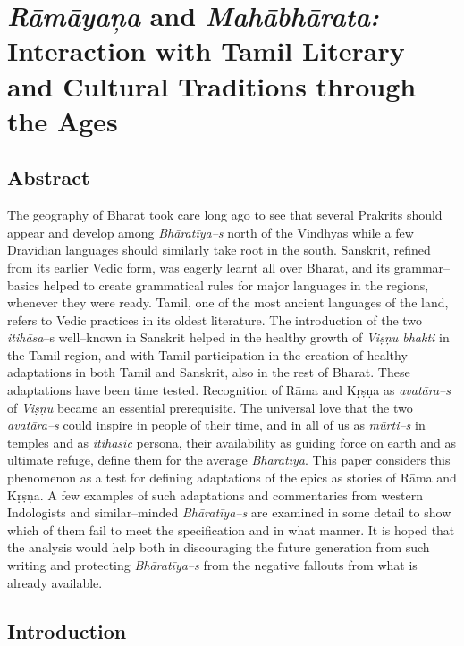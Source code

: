 
\chapter{\textit{Rāmāyaņa} and \textit{Mahābhārata:} Interaction with Tamil Literary and Cultural Traditions through the Ages}\label{chap10}



\section*{Abstract}

The geography of Bharat took care long ago to see that several Prakrits should appear and develop among \textit{Bhāratīya–s} north of the Vindhyas while a few Dravidian languages should similarly take root in the south. Sanskrit, refined from its earlier Vedic form, was eagerly learnt all over Bharat, and its grammar–basics helped to create grammatical rules for major languages in the regions, whenever they were ready. Tamil, one of the most ancient languages of the land, refers to Vedic practices in its oldest literature. The introduction of the two \textit{itihāsa}–s well–known in Sanskrit helped in the healthy growth of \textit{Viṣṇu bhakti} in the Tamil region, and with Tamil participation in the creation of healthy adaptations in both Tamil and Sanskrit, also in the rest of Bharat. These adaptations have been time tested. Recognition of Rāma and Kṛṣṇa as \textit{avatāra–s} of \textit{Viṣṇu} became an essential prerequisite. The universal love that the two \textit{avatāra–s} could inspire in people of their time, and in all of us as \textit{mūrti–s} in temples and as \textit{itihāsic} persona, their availability as guiding force on earth and as ultimate refuge, define them for the average \textit{Bhāratīya}. This paper considers this phenomenon as a test for defining adaptations of the epics as stories of Rāma and Kṛṣṇa. A few examples of such adaptations and commentaries from western Indologists and similar–minded \textit{Bhāratīya–s} are examined in some detail to show which of them fail to meet the specification and in what manner. It is hoped that the analysis would help both in discouraging the future generation from such writing and protecting \textit{Bhāratīya–s} from the negative fallouts from what is already available.


\section*{Introduction}

